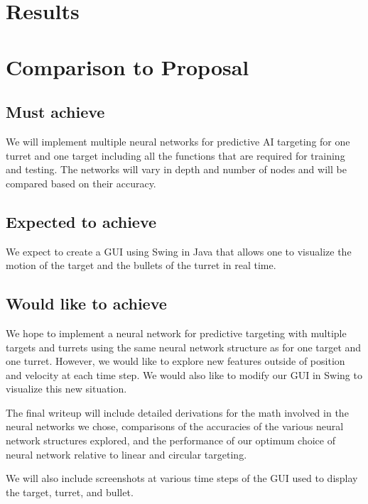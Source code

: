 \documentclass[11pt,letterpaper]{article}
\begin{document}
\section{Results}


\section{Comparison to Proposal}
\subsection{Must achieve}

We will implement multiple neural networks for predictive AI targeting for one turret and one target including all the functions that are required for training and testing. The networks will vary in depth and number of nodes and will be compared based on their accuracy.

\subsection{Expected to achieve}

We expect to create a GUI using Swing in Java that allows one to visualize the motion of the target and the bullets of the turret in real time.

\subsection{Would like to achieve}

We hope to implement a neural network for predictive targeting with multiple targets and turrets using the same neural network structure as for one target and one turret. However, we would like to explore new features outside of position and velocity at each time step. We would also like to modify our GUI in Swing to visualize this new situation.

The final writeup will include detailed derivations for the math involved in the neural networks we chose, comparisons of the accuracies of the various neural network structures explored, and the performance of our optimum choice of neural network relative to linear and circular targeting.

We will also include screenshots at various time steps of the GUI used to display the target, turret, and bullet.


\begin{thebibliography}

\end{thebibliography}
\end{document}
